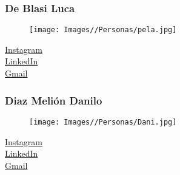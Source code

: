 \documentclass{article}
\begin{document}
\subsubsection{De Blasi Luca}

\begin{minipage}[t]{0.3\textwidth}

\begin{figure}[H]
    \texttt{[image: Images//Personas/pela.jpg]}
\end{figure}

\end{minipage}
\begin{minipage}[t]{0.5\textwidth}
    \vspace{3.5em}
    \href{https://instagram.com/luca.deblasii}{Instagram} \\[1em]
    \href{https://www.linkedin.com/in/luca-de-blasi-31164b304}{LinkedIn} \\[1em]
    \href{mailto:luqac2006@gmail.com}{Gmail}
\end{minipage}%

\subsubsection{Diaz Melión Danilo}

\begin{minipage}[t]{0.3\textwidth}

    \begin{figure}[H]
        \texttt{[image: Images//Personas/Dani.jpg]}
    \end{figure}

\end{minipage}
\begin{minipage}[t]{0.5\textwidth}
    \vspace{3.5em}
    \href{https://instagram.com/_danilodiaz}{Instagram} \\[1em]
    \href{https://www.linkedin.com/in/danilodiazmelion/}{LinkedIn} \\[1em]
    \href{mailto:danilodiaz934@gmail.com}{Gmail}
\end{minipage}%
\end{document}
